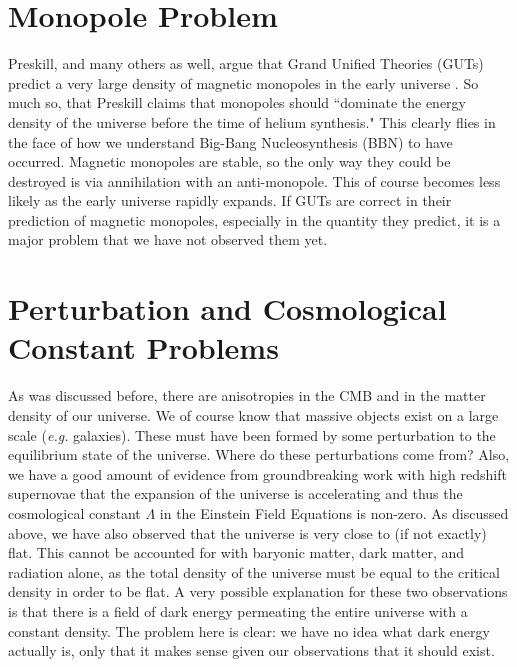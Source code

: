 \documentclass[aps,reprint,prl]{revtex4-1}
\begin{document}
\section*{Monopole Problem}
Preskill, and many others as well, argue that Grand Unified Theories (GUTs) predict a very large density of magnetic monopoles in the early universe \cite{preskill}.  So much so, that Preskill claims that monopoles should ``dominate the energy density of the universe before the time of helium synthesis."  This clearly flies in the face of how we understand Big-Bang Nucleosynthesis (BBN) to have occurred.  Magnetic monopoles are stable, so the only way they could be destroyed is via annihilation with an anti-monopole.  This of course becomes less likely as the early universe rapidly expands.  If GUTs are correct in their prediction of magnetic monopoles, especially in the quantity they predict, it is a major problem that we have not observed them yet.
\section*{Perturbation and Cosmological Constant Problems}
As was discussed before, there are anisotropies in the CMB and in the matter density of our universe.  We of course know that massive objects exist on a large scale (\emph{e.g.} galaxies).  These must have been formed by some perturbation to the equilibrium state of the universe.  Where do these perturbations come from?  Also, we have a good amount of evidence from groundbreaking work \cite{riess} with high redshift supernovae that the expansion of the universe is accelerating and thus the cosmological constant $\Lambda$ in the Einstein Field Equations is non-zero.  As discussed above, we have also observed that the universe is very close to (if not exactly) flat.  This cannot be accounted for with baryonic matter, dark matter, and radiation alone, as the total density of the universe must be equal to the critical density in order to be flat.  A very possible explanation for these two observations is that there is a field of dark energy permeating the entire universe with a constant density.  The problem here is clear: we have no idea what dark energy actually is, only that it makes sense given our observations that it should exist.
\end{document}
